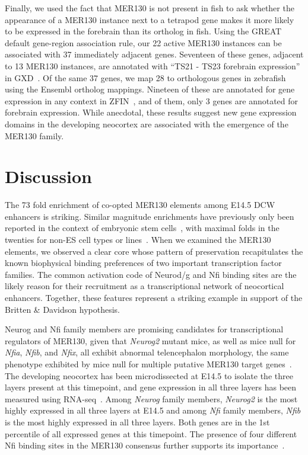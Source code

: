 Finally, we used the fact that MER130 is not present in fish to ask
whether the appearance of a MER130 instance next to a tetrapod gene
makes it more likely to be expressed in the forebrain than its ortholog
in fish. Using the GREAT default gene-region association rule, our 22
active MER130 instances can be associated with 37 immediately adjacent
genes. Seventeen of these genes, adjacent to 13 MER130 instances, are
annotated with ``TS21 - TS23 forebrain expression'' in
GXD~\citep{Eppig:2014ib}. Of the same 37 genes, we map 28 to orthologous
genes in zebrafish using the Ensembl ortholog mappings. Nineteen of
these are annotated for gene expression in any context in
ZFIN~\citep{Sprague:2006el}, and of them, only 3 genes are annotated for
forebrain expression. While anecdotal, these results suggest new gene
expression domains in the developing neocortex are associated with the
emergence of the MER130 family.

\section{Discussion}\label{sec:mer130Discussion}

The 73 fold enrichment of co-opted MER130 elements among E14.5 DCW
enhancers is striking. Similar magnitude enrichments have previously
only been reported in the context of embryonic stem
cells~\citep{Kunarso:2010kt,Jacques:2013jz}, with maximal folds in the twenties for
non-ES cell types or lines~\citep{Chuong:2013hj, Jacques:2013jz}. When we examined the
MER130 elements, we observed a clear core whose pattern of preservation
recapitulates the known biophysical binding preferences of two important
transcription factor families. The common activation code of Neurod/g
and Nfi binding sites are the likely reason for their recruitment as a
transcriptional network of neocortical enhancers. Together, these
features represent a striking example in support of the Britten \&
Davidson hypothesis.

Neurog and Nfi family members are promising candidates for
transcriptional regulators of MER130, given that \emph{Neurog2} mutant
mice, as well as mice null for \emph{Nfia}, \emph{Nfib}, and
\emph{Nfix}, all exhibit abnormal telencephalon morphology, the same
phenotype exhibited by mice null for multiple putative MER130 target
genes~\citep{Fode:2000ik, dasNeves:1999cn, SteelePerkins:2005kt, Campbell:2008ba}. The developing neocortex has been
microdissected at E14.5 to isolate the three layers present at this
timepoint, and gene expression in all three layers has been measured
using RNA-seq~\citep{Ayoub:2011jz}. Among \emph{Neurog} family members,
\emph{Neurog2} is the most highly expressed in all three layers at E14.5
and among \emph{Nfi} family members, \emph{Nfib} is the most highly
expressed in all three layers. Both genes are in the 1st percentile of
all expressed genes at this timepoint. The presence of four different
Nfi binding sites in the MER130 consensus further supports its
importance~\citep{Gotea:2010cc}.

